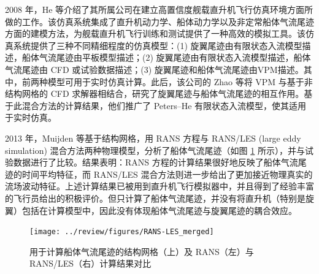 2008 年，He 等介绍了其所属公司在建立高置信度舰载直升机飞行仿真环境方面所做的工作。该仿真系统集成了直升机动力学、船体动力学以及非定常船体气流尾迹方面的建模方法，为舰载直升机飞行训练和测试提供了一种高效的模拟工具。该仿真系统提供了三种不同精细程度的仿真模型：(1)
旋翼尾迹由有限状态入流模型描述，船体气流尾迹由平板模型描述；(2) 旋翼尾迹由有限状态入流模型描述，船体气流尾迹由 CFD 或试验数据描述；(3)
旋翼尾迹和船体气流尾迹由VPM描述。其中，前两种模型可用于实时仿真计算。此后，该公司的 Zhao 等将
VPM 与基于非结构网格的 CFD 求解器相结合，研究了旋翼尾迹与船体气流尾迹的相互作用。基于此混合方法的计算结果，他们推广了 Peters–He
有限状态入流模型，使其适用于实时仿真。

2013 年，Muijden 等基于结构网格，用 RANS 方程与 RANS/LES
(large eddy simulation) 混合方法两种物理模型，分析了船体气流尾迹（如图 \ref{fig:structured-mesh}
所示），并与试验数据进行了比较。结果表明：RANS 方程的计算结果很好地反映了船体气流尾迹的时间平均特征，而 RANS/LES 混合方法则进一步给出了更加接近物理真实的流场波动特征。上述计算结果已被用到直升机飞行模拟器中，并且得到了经验丰富的飞行员给出的积极评价。但只计算了船体气流尾迹，并没有将直升机（特别是旋翼）包括在计算模型中，因此没有体现船体气流尾迹与旋翼尾迹的耦合效应。
\begin{figure}[h!]
\begin{centering}
\texttt{[image: ../review/figures/RANS-LES\_merged]}
\par\end{centering}
\caption{\label{fig:structured-mesh}用于计算船体气流尾迹的结构网格（上）及 RANS（左）与 RANS/LES（右）计算结果对比}
\end{figure}

